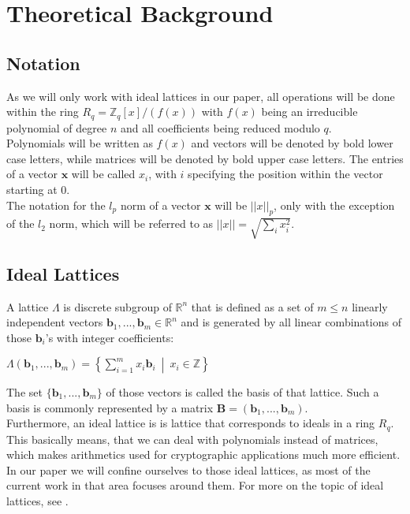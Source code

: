 %
%

\chapter{Theoretical Background}

\section{Notation}
As we will only work with ideal lattices in our paper, all operations will be done within the ring \(R_q=\mathbb{Z}_q[x]/(f(x))\) with \(f(x)\) being an irreducible polynomial of degree \(n\) and all coefficients being reduced modulo \(q\).\\
Polynomials will be written as \(f(x)\) and vectors will be denoted by bold lower case letters, while matrices will be denoted by bold upper case letters. The entries of a vector \(\textbf{x}\) will be called \(x_i\), with \(i\) specifying the position within the vector starting at 0.\\
The notation for the \(l_p\) norm of a vector \(\textbf{x}\) will be \(||x||_p\), only with the exception of the \(l_2\) norm, which will be referred to as \(||x||=\sqrt{\sum_{i} x_i^2}\).

\section{Ideal Lattices}
A lattice \(\Lambda\) is discrete subgroup of \(\mathbb{R}^n\) that is defined as a set of \(m \leq n\) linearly independent vectors \(\textbf{b}_1,...,\textbf{b}_m \in \mathbb{R}^n\) and is generated by all linear combinations of those \(\textbf{b}_i\)'s with integer coefficients:
\begin{center}
	\(\Lambda(\textbf{b}_1,...,\textbf{b}_m)=\left \{ \displaystyle \sum_{i=1}^{m} x_i \textbf{b}_i \: \middle | \: x_i \in \mathbb{Z} \right \}\)
\end{center}
The set \(\{\textbf{b}_1,...,\textbf{b}_m\}\) of those vectors is called the basis of that lattice. Such a basis is commonly represented by a matrix \(\textbf{B}=(\textbf{b}_1,...,\textbf{b}_m)\).\\
Furthermore, an ideal lattice is is lattice that corresponds to ideals in a ring \(R_q\). This basically means, that we can deal with polynomials instead of matrices, which makes arithmetics used for cryptographic applications much more efficient. In our paper we will confine ourselves to those ideal lattices, as most of the current work in that area focuses around them. For more on the topic of ideal lattices, see \cite{cryptoeprint:2012:230}.

